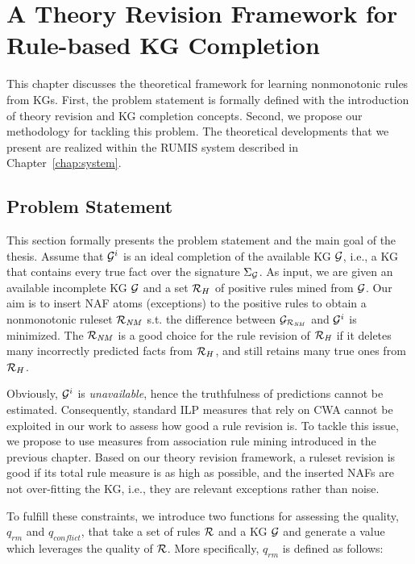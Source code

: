 \chapter{A Theory Revision Framework for Rule-based KG Completion}
\label{chap:frame}

This chapter discusses the theoretical framework for learning nonmonotonic rules from KGs. First, the problem statement is formally defined with the introduction of theory revision and KG completion concepts. Second, we propose our methodology for tackling this problem. The theoretical developments that we present are realized within the RUMIS system described in Chapter~\ref{chap:system}.

\section{Problem Statement}

This section formally presents the problem statement and the main goal of the thesis. Assume that $\mathcal{G}^i$ is an ideal completion of the available KG $\mathcal{G}$, i.e., a KG that contains every true fact over the signature $\Sigma_{\mathcal{G}}$. As input, we are given an available incomplete KG $\mathcal{G}$ and a set $\mathcal{R}_H$ of positive rules mined from $\mathcal{G}$. Our aim is to insert NAF atoms (exceptions) to the positive rules to obtain a nonmonotonic ruleset $\mathcal{R}_{\mathit{NM}}$ s.t. the difference between $\mathcal{G}_{\mathcal{R}_{\mathit{NM}}}$ and $\mathcal{G}^i$ is minimized. The $\mathcal{R}_{\mathit{NM}}$ is a good choice for the rule revision of $\mathcal{R}_{\mathit{H}}$ if it deletes many incorrectly predicted facts from $\mathcal{R}_H$, and still retains many true ones from $\mathcal{R}_H$.

Obviously, $\mathcal{G}^i$ is \emph{unavailable}, hence the truthfulness of predictions cannot be estimated. Consequently, standard ILP measures that rely on CWA cannot be exploited in our work to assess how good a rule revision is. To tackle this issue, we propose to use measures from association rule mining introduced in the previous chapter. Based on our theory revision framework, a ruleset revision is good if its total rule measure is as high as possible, and the inserted NAFs are not over-fitting the KG, i.e., they are relevant exceptions rather than noise.

To fulfill these constraints, we introduce two functions for assessing the quality, $q_{rm}$ and $q_{conflict}$, that take a set of rules $\mathcal{R}$ and a KG $\mathcal{G}$ and generate a value which leverages the quality of $\mathcal{R}$. More specifically, $q_{rm}$ is defined as follows:

